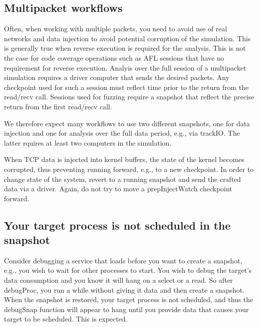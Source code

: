 \documentclass[titlepage]{article}
\begin{document}
\begin{appendices}
\subsection{Multipacket workflows}
Often, when working with multiple packets, you need to avoid use of real networks and data injection to avoid potential corruption of the simulation.
This is generally true when reverse execution is required for the analysis.  This is not the case for code coverage operations such as AFL sessions that
have no requirement for reverse execution.  Analyis over the full session of a multipacket simulation requires a driver computer that sends the desired
packets.  Any checkpoint used for such a session must reflect time prior to the return from the read/recv call.  Sessions used for fuzzing 
require a snapshot that reflect the precise return from the first read/recv call.  

We therefore expect many workflows to use two different snapshots, one for data injection and one for analysis over the full data period, e.g., via trackIO.
The latter rquires at least two computers in the simulation.  

When TCP data is injected into kernel buffers, the state of the kernel becomes corrupted, thus preventing running forward, e.g., to a new checkpoint.
In order to change state of the system, revert to a running snapshot and send the crafted data via a driver.  Again, do not try to move a prepInjectWatch
checkpoint forward.

\subsection{Your target process is not scheduled in the snapshot}
Consider debugging a service that loads before you want to create a snapshot, e.g., you wish to wait for other processes to start.
You wish to debug the target's data consumption and you know it will hang on a select or a read. So after debugProc, 
you run a while without giving it data and then create a snapshot.  When the snapshot
is restored, your target process is not scheduled, and thus the debugSnap function will appear to hang until you provide data that causes your
target to be scheduled.  This is expected.

\end{appendices}
\end{document}
